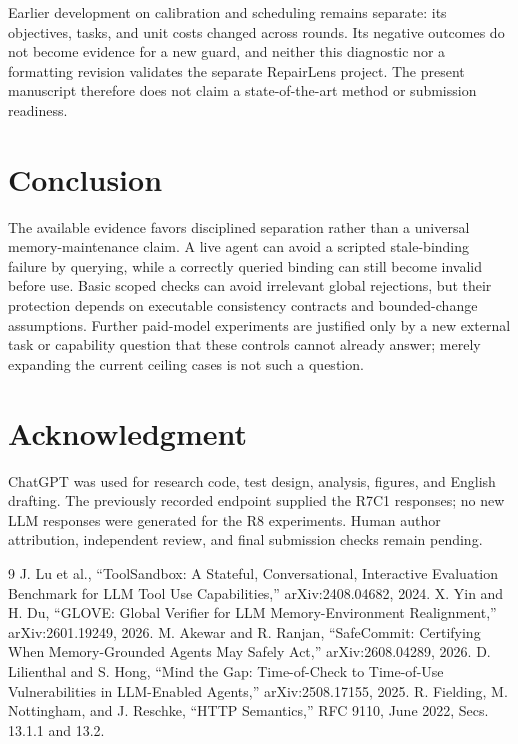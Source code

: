 \documentclass[10pt,letterpaper]{article}
\begin{document}
Earlier development on calibration and scheduling remains separate: its objectives, tasks, and unit costs changed across rounds. Its negative outcomes do not become evidence for a new guard, and neither this diagnostic nor a formatting revision validates the separate RepairLens project. The present manuscript therefore does not claim a state-of-the-art method or submission readiness.

\section{Conclusion}
The available evidence favors disciplined separation rather than a universal memory-maintenance claim. A live agent can avoid a scripted stale-binding failure by querying, while a correctly queried binding can still become invalid before use. Basic scoped checks can avoid irrelevant global rejections, but their protection depends on executable consistency contracts and bounded-change assumptions. Further paid-model experiments are justified only by a new external task or capability question that these controls cannot already answer; merely expanding the current ceiling cases is not such a question.

\section{Acknowledgment}
ChatGPT was used for research code, test design, analysis, figures, and English drafting. The previously recorded endpoint supplied the R7C1 responses; no new LLM responses were generated for the R8 experiments. Human author attribution, independent review, and final submission checks remain pending.

\begin{thebibliography}{9}
 J. Lu et al., ``ToolSandbox: A Stateful, Conversational, Interactive Evaluation Benchmark for LLM Tool Use Capabilities,'' arXiv:2408.04682, 2024.
 X. Yin and H. Du, ``GLOVE: Global Verifier for LLM Memory-Environment Realignment,'' arXiv:2601.19249, 2026.
 M. Akewar and R. Ranjan, ``SafeCommit: Certifying When Memory-Grounded Agents May Safely Act,'' arXiv:2608.04289, 2026.
 D. Lilienthal and S. Hong, ``Mind the Gap: Time-of-Check to Time-of-Use Vulnerabilities in LLM-Enabled Agents,'' arXiv:2508.17155, 2025.
 R. Fielding, M. Nottingham, and J. Reschke, ``HTTP Semantics,'' RFC 9110, June 2022, Secs. 13.1.1 and 13.2.
\end{thebibliography}
\end{document}
